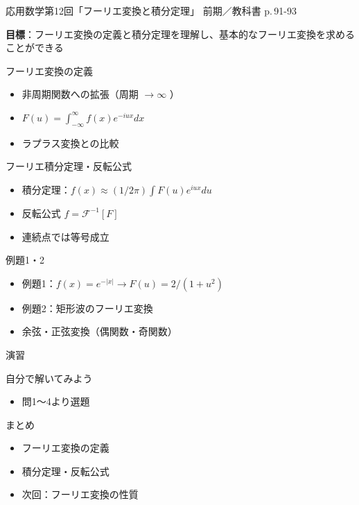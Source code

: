 \documentclass[aspectratio=43,professionalfonts,handout]{beamer}
\newcommand{\LectureNum}{12}
\newcommand{\LectureTitle}{フーリエ変換と積分定理}
\newcommand{\TextPages}{p.\,91-93}
\newcommand{\CourseName}{応用数学}
\renewcommand{\TermName}{前期}
\begin{document}
\begin{frame}{\CourseName\quad 第\LectureNum 回「\LectureTitle」}
  {\small \TermName\quad \TeacherName\quad ／\quad 教科書 \TextPages}

  \textbf{目標}：フーリエ変換の定義と積分定理を理解し、基本的なフーリエ変換を求めることができる

\end{frame}

\begin{frame}{フーリエ変換の定義}
  \begin{block}{}
  \begin{itemize}
    \item 非周期関数への拡張（周期 $ \to \infty$ ）
    \item $F(u) = \int_{-\infty}^{\infty} f(x)e^{-iux} dx$
    \item ラプラス変換との比較
  \end{itemize}
  \end{block}
\end{frame}

\begin{frame}{フーリエ積分定理・反転公式}
  \begin{block}{}
  \begin{itemize}
    \item 積分定理：$f(x) \approx (1/2\pi)\int F(u)e^{iux}du$
    \item 反転公式 $f = \mathcal{F}^{-1}[F]$
    \item 連続点では等号成立
  \end{itemize}
  \end{block}
\end{frame}

\begin{frame}{例題1・2}
  \begin{block}{}
  \begin{itemize}
    \item 例題1：$f(x)=e^{-|x|}  \to  F(u)=2/(1+u^{2})$
    \item 例題2：矩形波のフーリエ変換
    \item 余弦・正弦変換（偶関数・奇関数）
  \end{itemize}
  \end{block}
\end{frame}

\begin{frame}{演習}
  \begin{exampleblock}{自分で解いてみよう}
  \begin{itemize}
    \item 問1〜4より選題
  \end{itemize}
  \end{exampleblock}
\end{frame}

\begin{frame}{まとめ}
  \begin{itemize}
    \item フーリエ変換の定義
    \item 積分定理・反転公式
    \item 次回：フーリエ変換の性質
  \end{itemize}
\end{frame}
\end{document}
